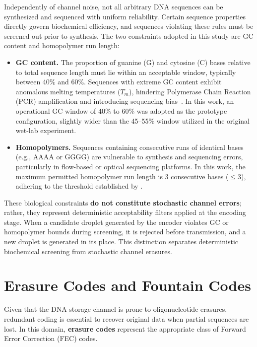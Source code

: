 Independently of channel noise, not all arbitrary DNA sequences can be synthesized and sequenced with uniform reliability. Certain sequence properties directly govern biochemical efficiency, and sequences violating these rules must be screened out prior to synthesis. The two constraints adopted in this study are GC content and homopolymer run length:

\begin{itemize}
    \item \textbf{GC content.} The proportion of guanine (G) and cytosine (C) bases relative to total sequence length must lie within an acceptable window, typically between 40\% and 60\%. Sequences with extreme GC content exhibit anomalous melting temperatures ($T_m$), hindering Polymerase Chain Reaction (PCR) amplification and introducing sequencing bias~\cite{erlich2017}. In this work, an operational GC window of 40\% to 60\% was adopted as the prototype configuration, slightly wider than the 45--55\% window utilized in the original wet-lab experiment.
    
    \item \textbf{Homopolymers.} Sequences containing consecutive runs of identical bases (e.g., AAAA or GGGG) are vulnerable to synthesis and sequencing errors, particularly in flow-based or optical sequencing platforms. In this work, the maximum permitted homopolymer run length is 3 consecutive bases ($\le 3$), adhering to the threshold established by .
\end{itemize}

These biological constraints \textbf{do not constitute stochastic channel errors}; rather, they represent deterministic acceptability filters applied at the encoding stage. When a candidate droplet generated by the encoder violates GC or homopolymer bounds during screening, it is rejected before transmission, and a new droplet is generated in its place. This distinction separates deterministic biochemical screening from stochastic channel erasures.

\section{Erasure Codes and Fountain Codes}
\label{sec:erasure_codes_and_fountain_codes}

Given that the DNA storage channel is prone to oligonucleotide erasures, redundant coding is essential to recover original data when partial sequences are lost. In this domain, \textbf{erasure codes} represent the appropriate class of Forward Error Correction (FEC) codes.

